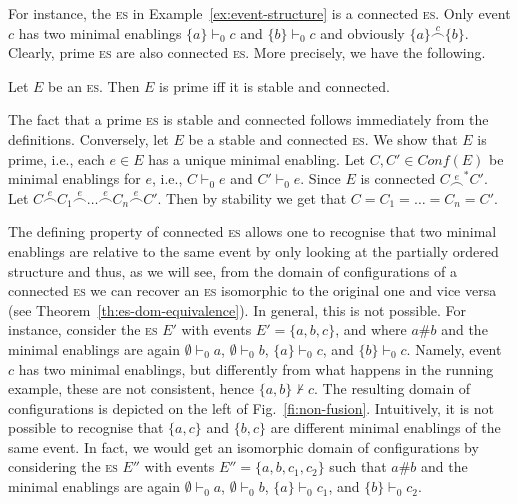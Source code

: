 \documentclass[conference]{IEEEtran}
\renewenvironment{proof}{\begin{IEEEproof}}{\end{IEEEproof}}
\newcommand{\esabbr}{\textsc{es}}
\newcommand{\conf}[1]{\ensuremath{\mathit{Conf}({#1})}}
\newcommand{\conn}[1]{\ensuremath{\stackrel{#1}{\frown}}}
\begin{document}
For instance, the {\esabbr} in
Example~\ref{ex:event-structure} is a connected {\esabbr}. Only event $c$ has
two minimal enablings $\{ a \} \vdash_0 c$ and $\{ b \} \vdash_0 c$
and obviously $\{ a \} \conn{c} \{ b \}$.
%
Clearly, prime {\esabbr} are also connected {\esabbr}. More precisely, we have the following.

\begin{proposition}[{primality = stability + connectedness}]
  \label{le:constapri}
  Let ${E}$ be an {\esabbr}. Then $E$ is prime iff it is stable and connected.
\end{proposition}

\begin{proof}
  The fact that a prime {\esabbr} is stable and connected follows immediately
  from the definitions. Conversely, let ${E}$ be a stable and
  connected {\esabbr}. We show that $E$ is prime, i.e., each $e \in E$ has a
  unique minimal enabling. Let $C, C' \in \conf{E}$ be minimal
  enablings for $e$, i.e., $C \vdash_0 e$ and $C' \vdash_0 e$. Since
  $E$ is connected $C \conn{e}^* C'$. Let
  $C \conn{e} C_1 \conn{e} \ldots \conn{e} C_n \conn{e} C'$. Then
  by stability we get that $C=C_1=\ldots = C_n =C'$. 
\end{proof}


The defining property of connected {\esabbr} allows one to recognise that two
minimal enablings are relative to the same event by only looking at
the partially ordered structure and thus, as we will see, from the
domain of configurations of a connected {\esabbr} we can recover an {\esabbr}
isomorphic to the original one and vice versa (see Theorem~\ref{th:es-dom-equivalence}). 
In general, this is not possible.
%
For instance, consider the {\esabbr} ${E}'$ with events
$E' = \{ a, b, c \}$, and where $a \# b$ and the minimal enablings are
again $\emptyset \vdash_0 a$, $\emptyset \vdash_0 b$,
$\{ a\} \vdash_0 c$, and $\{ b\} \vdash_0 c$. Namely, event $c$ has two
minimal enablings, but differently from what happens in the
running example, these are not consistent, hence
$ \{ a, b \} \not\vdash c$. The resulting domain of configurations is depicted on
the left of Fig.~\ref{fi:non-fusion}. Intuitively, it is not possible
to recognise that $\{ a,c\}$ and $\{ b, c \}$ are different minimal enablings
of the same event. In fact, we would get an isomorphic
domain of configurations by considering the {\esabbr} ${E}''$ with events
$E'' = \{ a, b, c_1, c_2 \}$ such that $a \# b$ and the minimal enablings
are again $\emptyset \vdash_0 a$, $\emptyset \vdash_0 b$,
$\{ a\} \vdash_0 c_1$, and $\{ b\} \vdash_0 c_2$.
\end{document}
